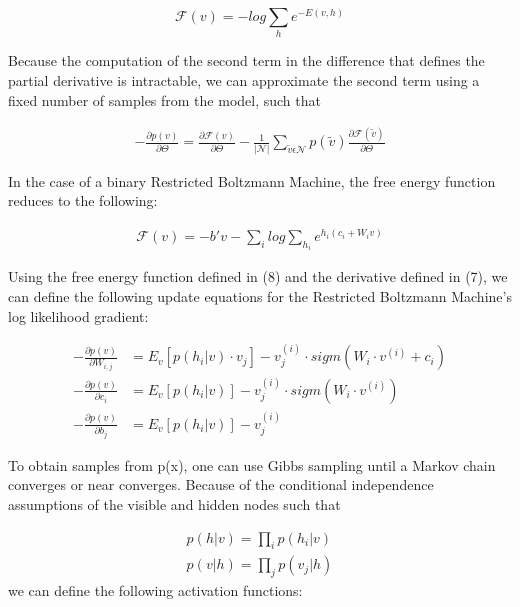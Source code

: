 \documentclass[journal]{IEEEtran}
\begin{document}
\begin{equation}
\mathcal{F}(v) = -log \sum\limits_{h}e^{-E(v,h)}
\end{equation}

Because the computation of the second term in the difference that defines the partial derivative is intractable, we can approximate the second term using a fixed number of samples from the model, such that 

\begin{equation}
\begin{aligned}
- \frac{\partial p(v)}{\partial \Theta} = \frac{\partial \mathcal{F}(v)}{\partial \Theta} -\frac{1}{|\mathcal{N}|} \sum\limits_{\tilde{v} \epsilon \mathcal{N}} p(\tilde{v}) \frac{\partial \mathcal{F}(\tilde{v})}{\partial \Theta}
\end{aligned}
\end{equation}

In the case of a binary Restricted Boltzmann Machine, the free energy function reduces to the following:

\begin{equation}
\begin{aligned}
\mathcal{F}(v) = -b'v - \sum\limits_{i}log\sum\limits_{h_{i}}e^{h_{i}(c_{i}+W_{i}v)}
\end{aligned}
\end{equation}

Using the free energy function defined in (8) and the derivative defined in (7), we can define the following update equations for the Restricted Boltzmann Machine's log likelihood gradient:

\begin{equation}
\begin{aligned}
- \frac{\partial p(v)}{\partial W_{i,j}} &= E_{v}[p(h_{i}|v)\cdot v_{j}] - v_{j}^{(i)}\cdot sigm(W_{i} \cdot v^{(i)} + c_{i})\\
- \frac{\partial p(v)}{\partial c_{i}} &= E_{v}[p(h_{i}|v)] - v_{j}^{(i)}\cdot sigm(W_{i} \cdot v^{(i)})\\
- \frac{\partial p(v)}{\partial b_{j}} &= E_{v}[p(h_{i}|v)] - v_{j}^{(i)}
\end{aligned}
\end{equation}

To obtain samples from p(x), one can use Gibbs sampling until a Markov chain converges or near converges.  Because of the conditional independence assumptions of the visible and hidden nodes such that 

\begin{equation}
\begin{aligned}
p(h|v) = \prod\limits_{i} p(h_{i}|v)\\
p(v|h) = \prod\limits_{j} p(v_{j}|h)
\end{aligned}
\end{equation} we can define the following activation functions:
\end{document}
